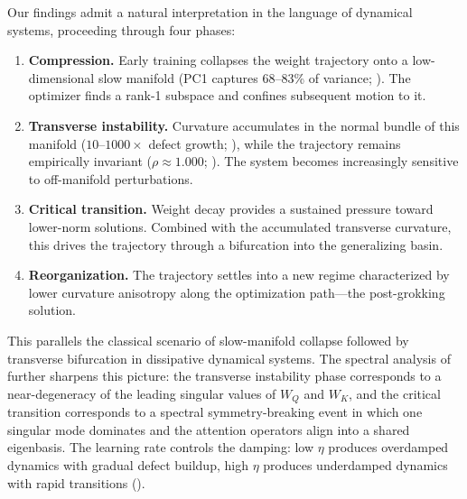 \documentclass[11pt]{article}
\begin{document}
Our findings admit a natural interpretation in the language of dynamical systems, proceeding through four phases:
\begin{enumerate}
    \item \textbf{Compression.} Early training collapses the weight trajectory onto a low-dimensional slow manifold (PC1 captures 68--83\% of variance; ). The optimizer finds a rank-1 subspace and confines subsequent motion to it.
    \item \textbf{Transverse instability.} Curvature accumulates in the normal bundle of this manifold ($10$--$1000\times$ defect growth; ), while the trajectory remains empirically invariant ($\rho \approx 1.000$; ). The system becomes increasingly sensitive to off-manifold perturbations.
    \item \textbf{Critical transition.} Weight decay provides a sustained pressure toward lower-norm solutions. Combined with the accumulated transverse curvature, this drives the trajectory through a bifurcation into the generalizing basin.
    \item \textbf{Reorganization.} The trajectory settles into a new regime characterized by lower curvature anisotropy along the optimization path---the post-grokking solution.
\end{enumerate}

This parallels the classical scenario of slow-manifold collapse followed by transverse bifurcation in dissipative dynamical systems.
The spectral analysis of  further sharpens this picture: the transverse instability phase corresponds to a near-degeneracy of the leading singular values of $W_Q$ and $W_K$, and the critical transition corresponds to a spectral symmetry-breaking event in which one singular mode dominates and the attention operators align into a shared eigenbasis.
The learning rate controls the damping: low $\eta$ produces overdamped dynamics with gradual defect buildup, high $\eta$ produces underdamped dynamics with rapid transitions ().
\end{document}
